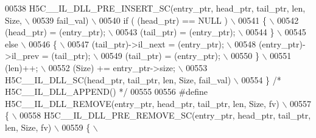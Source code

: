 \begin{DoxyCode}
00538 \textcolor{preprocessor}{    H5C\_\_IL\_DLL\_PRE\_INSERT\_SC(entry\_ptr, head\_ptr, tail\_ptr, len, Size,       \(\backslash\)}
00539 \textcolor{preprocessor}{                               fail\_val)                                      \(\backslash\)}
00540 \textcolor{preprocessor}{    if ( (head\_ptr) == NULL )                                                 \(\backslash\)}
00541 \textcolor{preprocessor}{    \{                                                                         \(\backslash\)}
00542 \textcolor{preprocessor}{       (head\_ptr) = (entry\_ptr);                                              \(\backslash\)}
00543 \textcolor{preprocessor}{       (tail\_ptr) = (entry\_ptr);                                              \(\backslash\)}
00544 \textcolor{preprocessor}{    \}                                                                         \(\backslash\)}
00545 \textcolor{preprocessor}{    else                                                                      \(\backslash\)}
00546 \textcolor{preprocessor}{    \{                                                                         \(\backslash\)}
00547 \textcolor{preprocessor}{       (tail\_ptr)->il\_next = (entry\_ptr);                                     \(\backslash\)}
00548 \textcolor{preprocessor}{       (entry\_ptr)->il\_prev = (tail\_ptr);                                     \(\backslash\)}
00549 \textcolor{preprocessor}{       (tail\_ptr) = (entry\_ptr);                                              \(\backslash\)}
00550 \textcolor{preprocessor}{    \}                                                                         \(\backslash\)}
00551 \textcolor{preprocessor}{    (len)++;                                                                  \(\backslash\)}
00552 \textcolor{preprocessor}{    (Size) += entry\_ptr->size;                                                \(\backslash\)}
00553 \textcolor{preprocessor}{    H5C\_\_IL\_DLL\_SC(head\_ptr, tail\_ptr, len, Size, fail\_val)                   \(\backslash\)}
00554 \textcolor{preprocessor}{\} }\textcolor{comment}{/* H5C\_\_IL\_DLL\_APPEND() */}\textcolor{preprocessor}{}
00555 
00556 \textcolor{preprocessor}{#define H5C\_\_IL\_DLL\_REMOVE(entry\_ptr, head\_ptr, tail\_ptr, len, Size, fv)    \(\backslash\)}
00557 \textcolor{preprocessor}{\{                                                                           \(\backslash\)}
00558 \textcolor{preprocessor}{    H5C\_\_IL\_DLL\_PRE\_REMOVE\_SC(entry\_ptr, head\_ptr, tail\_ptr, len, Size, fv) \(\backslash\)}
00559 \textcolor{preprocessor}{    \{                                                                       \(\backslash\)}

\end{DoxyCode}
